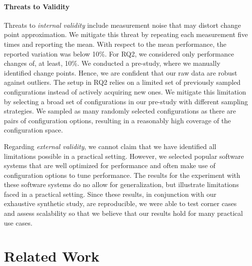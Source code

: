 \documentclass[sigconf]{acmart}
\begin{document}
	\paragraph{Threats to Validity}
	Threats to \emph{internal validity} include measurement noise that may distort change point approximation. We mitigate this threat by repeating each measurement five times and reporting the mean. With respect to the mean performance, the reported variation was below 10\%. For RQ2, we considered only performance changes of, at least, 10\%. We conducted a pre-study, where we manually identified change points.
	Hence, we are confident that our raw data are robust against outliers. The setup in RQ2 relies on a limited set of previously sampled configurations instead of actively acquiring new ones. We mitigate this limitation by selecting a broad set of configurations in our pre-study with different sampling strategies. We sampled as many randomly selected configurations as there are pairs of configuration options, resulting in a reasonably high coverage of the configuration space. 
	
	Regarding \emph{external validity}, we cannot claim that we have identified all limitations possible in a practical setting. However, we selected popular software systems that are well optimized for performance and often make use of configuration options to tune performance.  {\color{red}The results for the experiment with these software systems do no allow for generalization, but illustrate limitations faced in a practical setting. Since these results, in conjunction with our exhaustive synthetic study, are reproducible, we were able to test corner cases and assess scalability so that we believe that our results hold for many practical use cases.}
	
	\section{Related Work}\label{sec:rw}
\end{document}
